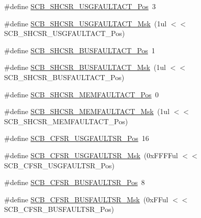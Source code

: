 \begin{DoxyCompactItemize}
\item 
\#define \hyperlink{group___c_m_s_i_s___c_m3___s_c_b_gae06f54f5081f01ed3f6824e451ad3656}{S\-C\-B\-\_\-\-S\-H\-C\-S\-R\-\_\-\-U\-S\-G\-F\-A\-U\-L\-T\-A\-C\-T\-\_\-\-Pos}~3
\item 
\#define \hyperlink{group___c_m_s_i_s___c_m3___s_c_b_gab3166103b5a5f7931d0df90949c47dfe}{S\-C\-B\-\_\-\-S\-H\-C\-S\-R\-\_\-\-U\-S\-G\-F\-A\-U\-L\-T\-A\-C\-T\-\_\-\-Msk}~(1ul $<$$<$ S\-C\-B\-\_\-\-S\-H\-C\-S\-R\-\_\-\-U\-S\-G\-F\-A\-U\-L\-T\-A\-C\-T\-\_\-\-Pos)
\item 
\#define \hyperlink{group___c_m_s_i_s___c_m3___s_c_b_gaf272760f2df9ecdd8a5fbbd65c0b767a}{S\-C\-B\-\_\-\-S\-H\-C\-S\-R\-\_\-\-B\-U\-S\-F\-A\-U\-L\-T\-A\-C\-T\-\_\-\-Pos}~1
\item 
\#define \hyperlink{group___c_m_s_i_s___c_m3___s_c_b_ga9d7a8b1054b655ad08d85c3c535d4f73}{S\-C\-B\-\_\-\-S\-H\-C\-S\-R\-\_\-\-B\-U\-S\-F\-A\-U\-L\-T\-A\-C\-T\-\_\-\-Msk}~(1ul $<$$<$ S\-C\-B\-\_\-\-S\-H\-C\-S\-R\-\_\-\-B\-U\-S\-F\-A\-U\-L\-T\-A\-C\-T\-\_\-\-Pos)
\item 
\#define \hyperlink{group___c_m_s_i_s___c_m3___s_c_b_ga7c856f79a75dcc1d1517b19a67691803}{S\-C\-B\-\_\-\-S\-H\-C\-S\-R\-\_\-\-M\-E\-M\-F\-A\-U\-L\-T\-A\-C\-T\-\_\-\-Pos}~0
\item 
\#define \hyperlink{group___c_m_s_i_s___c_m3___s_c_b_ga9147fd4e1b12394ae26eadf900a023a3}{S\-C\-B\-\_\-\-S\-H\-C\-S\-R\-\_\-\-M\-E\-M\-F\-A\-U\-L\-T\-A\-C\-T\-\_\-\-Msk}~(1ul $<$$<$ S\-C\-B\-\_\-\-S\-H\-C\-S\-R\-\_\-\-M\-E\-M\-F\-A\-U\-L\-T\-A\-C\-T\-\_\-\-Pos)
\item 
\#define \hyperlink{group___c_m_s_i_s___c_m3___s_c_b_gac8e4197b295c8560e68e2d71285c7879}{S\-C\-B\-\_\-\-C\-F\-S\-R\-\_\-\-U\-S\-G\-F\-A\-U\-L\-T\-S\-R\-\_\-\-Pos}~16
\item 
\#define \hyperlink{group___c_m_s_i_s___c_m3___s_c_b_ga565807b1a3f31891f1f967d0fa30d03f}{S\-C\-B\-\_\-\-C\-F\-S\-R\-\_\-\-U\-S\-G\-F\-A\-U\-L\-T\-S\-R\-\_\-\-Msk}~(0x\-F\-F\-F\-Ful $<$$<$ S\-C\-B\-\_\-\-C\-F\-S\-R\-\_\-\-U\-S\-G\-F\-A\-U\-L\-T\-S\-R\-\_\-\-Pos)
\item 
\#define \hyperlink{group___c_m_s_i_s___c_m3___s_c_b_ga555a24f4f57d199f91d1d1ab7c8c3c8a}{S\-C\-B\-\_\-\-C\-F\-S\-R\-\_\-\-B\-U\-S\-F\-A\-U\-L\-T\-S\-R\-\_\-\-Pos}~8
\item 
\#define \hyperlink{group___c_m_s_i_s___c_m3___s_c_b_ga26dc1ddfdc37a6b92597a6f7e498c1d6}{S\-C\-B\-\_\-\-C\-F\-S\-R\-\_\-\-B\-U\-S\-F\-A\-U\-L\-T\-S\-R\-\_\-\-Msk}~(0x\-F\-Ful $<$$<$ S\-C\-B\-\_\-\-C\-F\-S\-R\-\_\-\-B\-U\-S\-F\-A\-U\-L\-T\-S\-R\-\_\-\-Pos)
$$
\end{DoxyCompactItemize}
